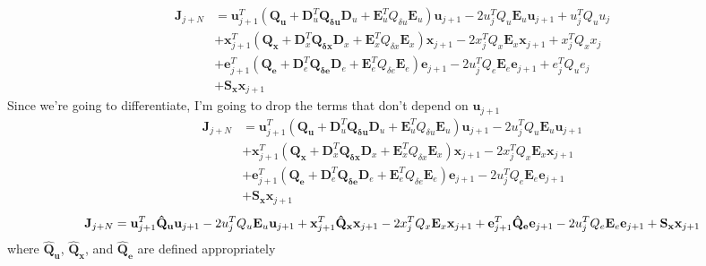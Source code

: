 \documentclass[landscape]{article}
\begin{document}
\begin{align}
\mathbf{J}_{j+N} 
& = \mathbf{u}_{j+1}^T \left(\mathbf{Q_u} + \mathbf{D}_u^T\mathbf{Q_{\delta u}} \mathbf{D}_u + \mathbf{E}_u^T Q_{\delta u} \mathbf{E}_u \right) \mathbf{u}_{j+1} - 2u_j^T Q_u \mathbf{E}_u \mathbf{u}_{j+1} + u_j^T Q_u u_j\\
& + \mathbf{x}_{j+1}^T \left(\mathbf{Q_x} + \mathbf{D}_x^T\mathbf{Q_{\delta x}} \mathbf{D}_x + \mathbf{E}_x^T Q_{\delta x} \mathbf{E}_x \right) \mathbf{x}_{j+1} - 2x_j^T Q_x \mathbf{E}_x \mathbf{x}_{j+1} + x_j^T Q_x x_j\\
& + \mathbf{e}_{j+1}^T \left(\mathbf{Q_e} + \mathbf{D}_e^T\mathbf{Q_{\delta e}} \mathbf{D}_e + \mathbf{E}_e^T Q_{\delta e} \mathbf{E}_e \right) \mathbf{e}_{j+1} - 2u_j^T Q_e \mathbf{E}_e \mathbf{e}_{j+1} + e_j^T Q_u e_j\\
& + \mathbf{S_x}\mathbf{x}_{j+1}
\end{align}
Since we're going to differentiate, I'm going to drop the terms that don't depend on $\mathbf{u}_{j+1}$
\begin{align}
\mathbf{J}_{j+N} 
& = \mathbf{u}_{j+1}^T \left(\mathbf{Q_u} + \mathbf{D}_u^T\mathbf{Q_{\delta u}} \mathbf{D}_u + \mathbf{E}_u^T Q_{\delta u} \mathbf{E}_u \right) \mathbf{u}_{j+1} - 2u_j^T Q_u \mathbf{E}_u \mathbf{u}_{j+1} \\
& + \mathbf{x}_{j+1}^T \left(\mathbf{Q_x} + \mathbf{D}_x^T\mathbf{Q_{\delta x}} \mathbf{D}_x + \mathbf{E}_x^T Q_{\delta x} \mathbf{E}_x \right) \mathbf{x}_{j+1} - 2x_j^T Q_x \mathbf{E}_x \mathbf{x}_{j+1} \\
& + \mathbf{e}_{j+1}^T \left(\mathbf{Q_e} + \mathbf{D}_e^T\mathbf{Q_{\delta e}} \mathbf{D}_e + \mathbf{E}_e^T Q_{\delta e} \mathbf{E}_e \right) \mathbf{e}_{j+1} - 2u_j^T Q_e \mathbf{E}_e \mathbf{e}_{j+1} \\
& + \mathbf{S_x}\mathbf{x}_{j+1}
\end{align}
\begin{equation}
\mathbf{J}_{j+N} = 
\mathbf{u}_{j+1}^T \mathbf{\hat{Q}_u} \mathbf{u}_{j+1}- 2u_j^T Q_u \mathbf{E}_u \mathbf{u}_{j+1}\\
+\mathbf{x}_{j+1}^T \mathbf{\hat{Q}_x} \mathbf{x}_{j+1}- 2x_j^T Q_x \mathbf{E}_x \mathbf{x}_{j+1}\\
+\mathbf{e}_{j+1}^T \mathbf{\hat{Q}_e} \mathbf{e}_{j+1}- 2u_j^T Q_e \mathbf{E}_e \mathbf{e}_{j+1}\\
+\mathbf{S_x}\mathbf{x}_{j+1}
\end{equation}
where $\mathbf{\hat{Q}_u}$, $\mathbf{\hat{Q}_x}$, and $\mathbf{\hat{Q}_e}$ are defined appropriately
\end{document}

